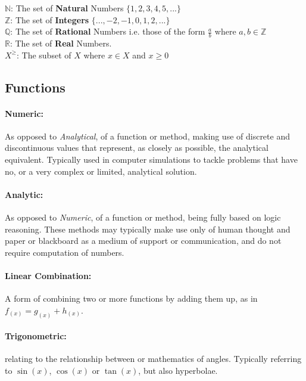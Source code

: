 \documentclass[main.tex]{subfiles}
\begin{document}
      $\mathbb{N}$: The set of \textbf{Natural} Numbers $\{1,2,3,4,5,...\}$
      \\
      $\mathbb{Z}$: The set of \textbf{Integers} $\{...,-2,-1,0,1,2,...\}$
      \\
      $\mathbb{Q}$: The set of \textbf{Rational} Numbers i.e. those of the form $\frac{a}{b}$ where $a,b \in \mathbb{Z}$
      \\
      $\mathbb{R}$: The set of \textbf{Real} Numbers.
      \\
      $X^{\geq}$: The subset of $X$ where $x \in X$ and $x\geq0$
   
    \subsection{Functions}
   
      \paragraph{Numeric:} As opposed to \textit{Analytical}, of a function or method, making use of discrete and discontinuous values that represent, as closely as possible, the analytical equivalent. Typically used in computer simulations to tackle problems that have no, or a very complex or limited, analytical solution.
      
      \paragraph{Analytic:} As opposed to \textit{Numeric}, of a function or method, being fully based on logic reasoning. These methods may typically make use only of human thought and paper or blackboard as a medium of support or communication, and do not require computation of numbers.
        
      \paragraph{Linear Combination:} A form of combining two or more functions by  adding them up, as in $f_{(x)}= g_{(x)} + h_{(x)}$.
       
      \paragraph{Trigonometric:} relating to the relationship between or mathematics of angles. Typically referring to $\sin(x)$, $\cos(x)$ or $\tan(x)$, but also hyperbolae.
      
\end{document}
